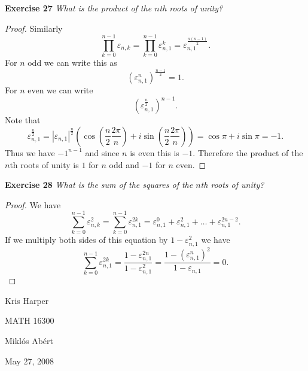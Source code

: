 \documentclass{article}
\begin{document}
\begin{flushleft}
\textbf{Exercise 27}
\textsl{What is the product of the $n$th roots of unity?}
\begin{proof}
Similarly
\[
\prod_{k=0}^{n-1} \varepsilon_{n,k} = \prod_{k=0}^{n-1} \varepsilon_{n,1}^k = \varepsilon_{n,1}^{\frac{n(n-1)}{2}}.
\]
For $n$ odd we can write this as
\[
\left ( \varepsilon_{n,1}^n \right )^{\frac{n-1}{2}} = 1.
\]
For $n$ even we can write
\[
\left ( \varepsilon_{n,1}^{\frac{n}{2}} \right )^{n-1}.
\]
Note that
\[
\varepsilon_{n,1}^{\frac{n}{2}} = |\varepsilon_{n,1}|^{\frac{n}{2}} \left ( \cos \left ( \frac{n}{2} \frac{2 \pi}{n} \right ) + i \sin \left ( \frac{n}{2} \frac{2 \pi}{n} \right ) \right ) = \cos \pi + i \sin \pi = -1.
\]
Thus we have $-1^{n-1}$ and since $n$ is even this is $-1$. Therefore the product of the $n$th roots of unity is $1$ for $n$ odd and $-1$ for $n$ even.
\end{proof}

\textbf{Exercise 28}
\textsl{What is the sum of the squares of the $n$th roots of unity?}
\begin{proof}
We have
\[
\sum_{k=0}^{n-1} \varepsilon_{n,k}^2 = \sum_{k=0}^{n-1} \varepsilon_{n,1}^{2k} = \varepsilon_{n,1}^0 + \varepsilon_{n,1}^2 + \dots + \varepsilon_{n,1}^{2n-2}.
\]
If we multiply both sides of this equation by $1-\varepsilon_{n,1}^2$ we have
\[
\sum_{k=0}^{n-1} \varepsilon_{n,1}^{2k} = \frac{1-\varepsilon_{n,1}^{2n}}{1-\varepsilon_{n,1}^2} = \frac{1 - \left ( \varepsilon_{n,1}^n \right )^2}{1 - \varepsilon_{n,1}} = 0.
\]
\end{proof}

\end{flushleft}

\newpage

\begin{flushright}
Kris Harper

MATH 16300

Mikl\'{o}s Ab\'{e}rt

May 27, 2008
\end{flushright}
\end{document}
